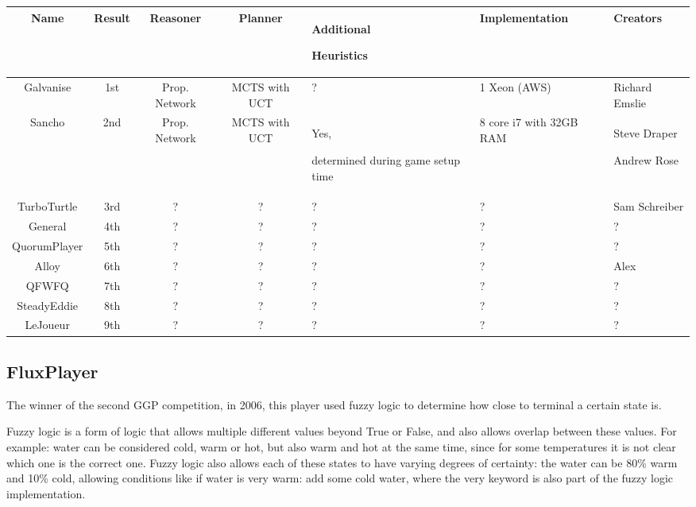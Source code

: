 \begin{table}
\small
\begin{tabular}{| c | c | c | c | p{2.5cm} | p{2.5cm} | p{2.5cm} |}
\hline  Name & Result & Reasoner & Planner & Additional \par Heuristics & Implementation & Creators \\
\hline  Galvanise & 1st & Prop. Network & MCTS with UCT & ? & 1 Xeon (AWS) & Richard Emslie \\
\hline  Sancho & 2nd & Prop. Network & MCTS with UCT & Yes, \par determined during game setup time & 8 core i7 with 32GB RAM & Steve Draper \par Andrew Rose \\
\hline  TurboTurtle & 3rd & ? & ? & ? & ? & Sam Schreiber \\
\hline  General & 4th & ? & ? & ? & ? & ? \\ %
\hline  QuorumPlayer & 5th & ? & ? & ? & ? & ? \\ %
\hline  Alloy & 6th & ? & ? & ? & ? & Alex \\ %
\hline  QFWFQ & 7th & ? & ? & ? & ? & ? \\ %
\hline  SteadyEddie & 8th & ? & ? & ? & ? & ? \\ %
\hline  LeJoueur & 9th & ? & ? & ? & ? & ? \\ %
  
\hline
\end{tabular}
\end{table}


\subsection{FluxPlayer}
The winner of the second GGP competition, in 2006, this player used fuzzy logic to determine how close to terminal a certain state is.

Fuzzy logic is a form of logic that allows multiple different values beyond True or False, and also allows overlap between these values. For example: water can be considered cold, warm or hot, but also warm and hot at the same time, since for some temperatures it is not clear which one is the correct one. Fuzzy logic also allows each of these states to have varying degrees of certainty: the water can be 80\% warm and 10\% cold, allowing conditions like if water is very warm: add some cold water, where the very keyword is also part of the fuzzy logic implementation.

